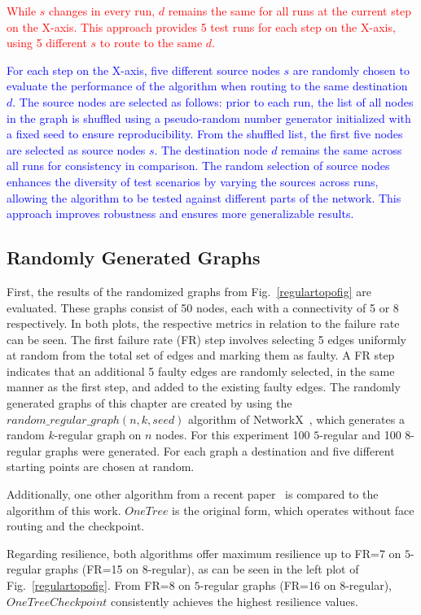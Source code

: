 \documentclass[conference]{IEEEtran}
\begin{document}
\textcolor{red}{While $s$ changes in every run, $d$ remains the same for all runs at the current step on the X-axis. This approach provides 5 test runs for each step on the X-axis, using 5 different $s$ to route to the same $d$.}

\textcolor{blue}{For each step on the X-axis, five different source nodes $s$ are randomly chosen to evaluate the performance of the algorithm when routing to the same destination $d$. 
The source nodes are selected as follows: prior to each run, the list of all nodes in the graph is shuffled using a pseudo-random number generator initialized with a fixed seed to ensure reproducibility.
From the shuffled list, the first five nodes are selected as source nodes $s$. The destination node $d$ remains the same across all runs for consistency in comparison. 
The random selection of source nodes enhances the diversity of test scenarios by varying the sources across runs, allowing the algorithm to be tested against different parts of the network. This approach improves robustness and ensures more generalizable results.}

\subsection{Randomly Generated Graphs}
\label{randomEval}
First, the results of the randomized graphs from Fig.~\ref{regulartopofig} are evaluated. These graphs consist of 50 nodes, each with a connectivity of 5 or 8 respectively. In both plots, the respective metrics in relation to the failure rate can be seen. 
The first failure rate (FR) step involves selecting 5 edges uniformly at random from the total set of edges and marking them as faulty.
A FR step indicates that an additional 5 faulty edges are randomly selected, in the same manner as the first step, and added to the existing faulty edges.
The randomly generated graphs of this chapter are created by using the $random\_regular\_graph(n, k, seed)$ algorithm of NetworkX~\cite{networkx}, which generates a random
$k$-regular graph on $n$ nodes. For this experiment 100 $5$-regular and 100 $8$-regular graphs were generated. For each graph a destination
and five different starting points are chosen at random.

Additionally, one other algorithm from a recent paper~\cite{tree} is compared to the algorithm of this work. $OneTree$ is the original form, which operates without face routing and the checkpoint.

Regarding resilience, both algorithms offer maximum resilience up to FR=7 on $5$-regular graphs (FR=15 on $8$-regular), as can be seen in the left plot of Fig.~\ref{regulartopofig}.
From FR=8 on $5$-regular graphs (FR=16 on $8$-regular), $One Tree Checkpoint$ consistently achieves the highest resilience values.
\end{document}
